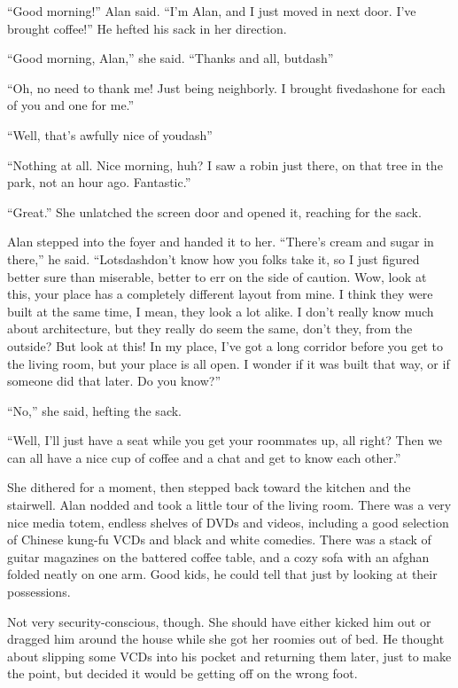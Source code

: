 ``Good morning!'' Alan said.  ``I'm Alan, and I just moved in next
door.  I've brought coffee!'' He hefted his sack in her direction.

``Good morning, Alan,'' she said.  ``Thanks and all, butdash{}''

``Oh, no need to thank me!  Just being neighborly.  I brought
fivedash{}one for each of you and one for me.''

``Well, that's awfully nice of youdash{}''

``Nothing at all.  Nice morning, huh?  I saw a robin just there, on
that tree in the park, not an hour ago.  Fantastic.''

``Great.'' She unlatched the screen door and opened it, reaching for
the sack.

Alan stepped into the foyer and handed it to her.  ``There's cream and
sugar in there,'' he said.  ``Lotsdash{}don't know how you folks take it,
so I just figured better sure than miserable, better to err on the
side of caution.  Wow, look at this, your place has a completely
different layout from mine.  I think they were built at the same time,
I mean, they look a lot alike.  I don't really know much about
architecture, but they really do seem the same, don't they, from the
outside?  But look at this!  In my place, I've got a long corridor
before you get to the living room, but your place is all open.  I
wonder if it was built that way, or if someone did that later.  Do you
know?''

``No,'' she said, hefting the sack.

``Well, I'll just have a seat while you get your roommates up, all
right?  Then we can all have a nice cup of coffee and a chat and get
to know each other.''

She dithered for a moment, then stepped back toward the kitchen and
the stairwell.  Alan nodded and took a little tour of the living room. 
There was a very nice media totem, endless shelves of DVDs and videos,
including a good selection of Chinese kung-fu VCDs and black and white
comedies.  There was a stack of guitar magazines on the battered
coffee table, and a cozy sofa with an afghan folded neatly on one arm. 
Good kids, he could tell that just by looking at their possessions.

Not very security-conscious, though.  She should have either kicked
him out or dragged him around the house while she got her roomies out
of bed.  He thought about slipping some VCDs into his pocket and
returning them later, just to make the point, but decided it would be
getting off on the wrong foot.

